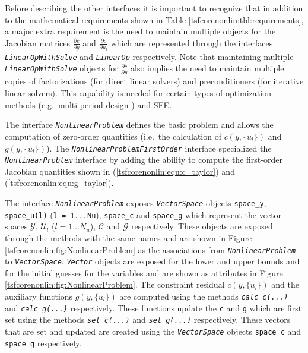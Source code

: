 Before describing the other interfaces it is important to recognize
that in addition to the mathematical requirements shown in Table
\ref{tsfcorenonlin:tbl:requirements}, a major extra requirement is the need to
maintain multiple objects for the Jacobian matrices $\frac{\partial
c}{\partial y}$ and $\frac{\partial c}{\partial u_l}$ which are
represented through the interfaces
\texttt{\textit{Linear\-Op\-With\-Solve}} and
\texttt{\textit{LinearOp}} respectively.  Note that maintaining
multiple \texttt{\textit{Linear\-Op\-With\-Solve}} objects for
$\frac{\partial c}{\partial y}$ also implies the need to maintain
multiple copies of factorizations (for direct linear solvers) and
preconditioners (for iterative linear solvers).  This capability is
needed for certain types of optimization methods (e.g.~multi-period
design \cite{ref:varvarezos_1994}) and SFE.

The interface \texttt{\textit{Nonlinear\-Problem}} defines the basic
problem and allows the computation of zero-order quantities (i.e.~the
calculation of $c(y,\{u_l\})$ and $g(y,\{u_l\})$).  The
\texttt{\textit{Nonlinear\-Problem\-First\-Order}} interface
specialized the \texttt{\textit{Nonlinear\-Problem}} interface by
adding the ability to compute the first-order Jacobian quantities
shown in (\ref{tsfcorenonlin:equ:c_taylor}) and (\ref{tsfcorenonlin:equ:g_taylor}).

The interface \texttt{\textit{Nonlinear\-Problem}} exposes
\texttt{\textit{VectorSpace}} objects
\texttt{space\_y}, \texttt{space\_u(l)} (\texttt{l = 1...Nu}),
\texttt{space\_c} and \texttt{space\_g} which represent the vector
spaces $\mathcal{Y}$, $\mathcal{U}_l$ ($l = 1 \ldots N_u$),
$\mathcal{C}$ and $\mathcal{G}$ respectively.  These objects are
exposed through the methods with the same names and are shown in
Figure \ref{tsfcorenonlin:fig:NonlinearProblem} as the associations from
\texttt{\textit{Nonlinear\-Problem}} to
\texttt{\textit{VectorSpace}}. \texttt{\textit{Vector}} objects are
exposed for the lower and upper bounds and for the initial guesses for
the variables and are shown as attributes in Figure
\ref{tsfcorenonlin:fig:NonlinearProblem}.  The constraint residual
$c(y,\{u_l\})$ and the auxiliary functions $g(y,\{u_l\})$ are computed
using the methods
\texttt{\textit{calc\_c(...)}} and
\texttt{\textit{calc\_g(...)}}  respectively.  These functions
update the  \texttt{c} and \texttt{g} which are first set using
the methods \texttt{\textit{set\_c(...)}} and
\texttt{\textit{set\_g(...)}} respectively.  These vectors that
are set and updated are created using the
\texttt{\textit{VectorSpace}} objects \texttt{space\_c} and
\texttt{space\_g} respectively.

